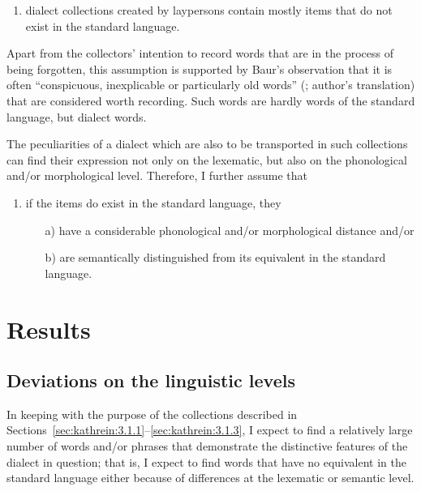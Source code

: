 \documentclass[output=paper]{langscibook}
\begin{document}
\begin{enumerate}
\item dialect collections created by laypersons contain mostly items that do not exist in the standard language.
\end{enumerate}

Apart from the collectors’ intention to record words that are in the process of being forgotten, this assumption is supported by Baur’s observation that it is often “conspicuous, inexplicable or particularly old words” (\citealt[66]{Baur1987}; author’s translation) that are considered worth recording. Such words are hardly words of the standard language, but dialect words.
\largerpage[-2]

The peculiarities of a dialect which are also to be transported in such collections can find their expression not only on the lexematic, but also on the phonological and/or morphological level. Therefore, I further assume that

\begin{enumerate}[resume] 
\item if the items do exist in the standard language, they 
\begin{itemize}
\item[a)] have a considerable phonological and/or morphological distance and/or
\item[b)] are semantically distinguished from its equivalent in the standard language.
\end{itemize}
\end{enumerate}

\section{Results}
\label{sec:kathrein:5}
\subsection{Deviations on the linguistic levels}
\label{sec:kathrein:5.1}
In keeping with the purpose of the collections described in Sections~\ref{sec:kathrein:3.1.1}--\ref{sec:kathrein:3.1.3}, I expect to find a relatively large number of words and/or phrases that demonstrate the distinctive features of the dialect in question; that is, I expect to find words that have no equivalent in the standard language either because of differences at the lexematic or semantic level.
\end{document}
